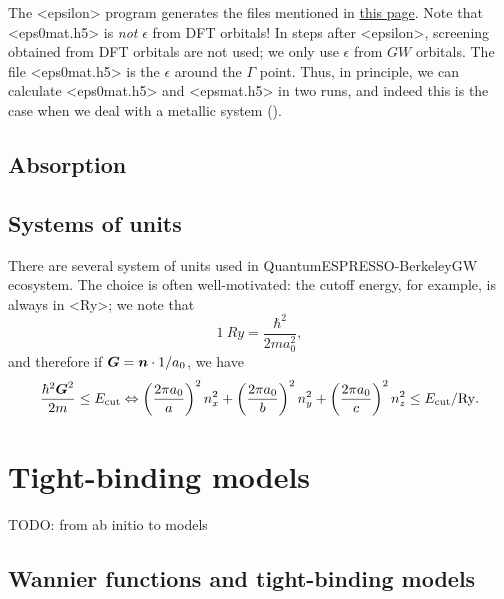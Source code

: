 \documentclass[hyperref, a4paper, 12pt]{report}
\def\ce#1{<#1>}%
\def\texttt#1{<#1>}%
\newcommand{\shortcode}[1]{\texttt{#1}}
\begin{document}
The \shortcode{epsilon} program generates the files mentioned in 
\href{http://manual.berkeleygw.org/2.0/epsilon-overview/}{this page}.
Note that \shortcode{eps0mat.h5} is \emph{not} $\epsilon$ from DFT orbitals!
In steps after \shortcode{epsilon},
screening obtained from DFT orbitals are not used;
we only use $\epsilon$ from $GW$ orbitals.
The file \shortcode{eps0mat.h5} is the $\epsilon$ around the $\Gamma$ point.
Thus, in principle,
we can calculate \shortcode{eps0mat.h5} and \shortcode{epsmat.h5}
in two runs,
and indeed this is the case when we deal with a metallic system
().

\section{Absorption}

\subsection{}

\section{Systems of units}

There are several system of units used in QuantumESPRESSO-BerkeleyGW ecosystem.
The choice is often well-motivated: 
the cutoff energy, for example, 
is always in \ce{Ry};
we note that 
\begin{equation}
    \SI{1}{Ry} = \frac{\hbar^2}{2 m a_0^2},
\end{equation}
and therefore if $\vb*{G} = \vb*{n} \cdot 1 / a_0$, we have 
\begin{equation}
    \frac{\hbar^2 \vb*{G}^2}{2m} \leq E_{\text{cut}} \Leftrightarrow
    \left(\frac{2\pi a_0}{a}\right)^2 n_x^2 + \left(\frac{2 \pi a_0}{b}\right)^2 n_y^2 + \left(\frac{2 \pi a_0}{c}\right)^2 n_z^2 \leq E_{\text{cut}} / \unit{Ry}.
\end{equation}

\chapter{Tight-binding models}

TODO: from ab initio to models

\section{Wannier functions and tight-binding models}
\end{document}
